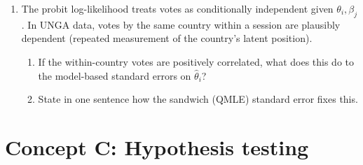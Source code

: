 \documentclass{article}
\begin{document}
\begin{enumerate}[label=\textbf{B.\arabic*},leftmargin=*,itemsep=10pt]
\item  The probit log-likelihood treats votes as conditionally independent given $\theta_i, \beta_j$.  In UNGA data, votes by the same country within a session are plausibly dependent (repeated measurement of the country's latent position).
\begin{enumerate}[label=(\alph*)]
  \item If the within-country votes are positively correlated, what does this do to the model-based standard errors on $\hat\theta_i$?
  \item State in one sentence how the sandwich (QMLE) standard error fixes this.
\end{enumerate}

\end{enumerate}

\bigskip

\section*{Concept C: Hypothesis testing}
\end{document}
